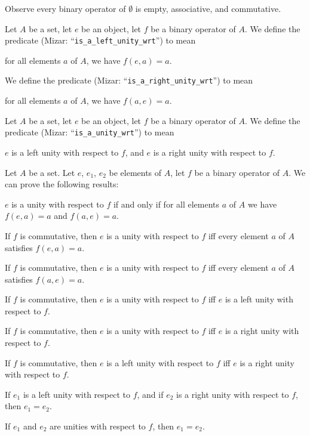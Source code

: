 \documentclass{article}
\begin{document}
Observe every binary operator of $\emptyset$ is empty, associative, and
commutative.

\begin{definition}
Let $A$ be a set, let $e$ be an object, let $f$ be a binary operator of
$A$.
We define the predicate 
(Mizar: ``\verb#is_a_left_unity_wrt#'') to mean
\begin{defn}
\item for all elements $a$ of $A$, we have $f(e,a)=a$.
\end{defn}
We define the predicate 
(Mizar: ``\verb#is_a_right_unity_wrt#'') to mean
\begin{defn}
\item for all elements $a$ of $A$, we have $f(a,e)=a$.
\end{defn}
\end{definition}

\begin{definition}
Let $A$ be a set, let $e$ be an object, let $f$ be a binary operator of $A$.
We define the predicate 
(Mizar: ``\verb#is_a_unity_wrt#'') to mean
\begin{defn}
\item\label{binop1:def7} $e$ is a left unity with respect to $f$, and $e$ is a right unity
  with respect to $f$.
\end{defn}
\end{definition}

Let $A$ be a set.
Let $e$, $e_{1}$, $e_{2}$ be elements of $A$,
let $f$ be a binary operator of $A$.
We can prove the following results:
\begin{thm}
\item\label{binop1:3} $e$ is a unity with respect to $f$ if and only if
  for all elements $a$ of $A$ we have $f(e,a)=a$ and $f(a,e)=a$.
\item\label{binop1:4} If $f$ is commutative,
  then $e$ is a unity with respect to $f$ iff every element $a$ of $A$
  satisfies $f(e,a)=a$.
\item\label{binop1:5} If $f$ is commutative,
  then $e$ is a unity with respect to $f$ iff every element $a$ of $A$
  satisfies $f(a,e)=a$.
\item\label{binop1:6} If $f$ is commutative,
  then $e$ is a unity with respect to $f$ iff $e$ is a left unity with
  respect to $f$.
\item\label{binop1:7} If $f$ is commutative,
  then $e$ is a unity with respect to $f$ iff $e$ is a right unity with
  respect to $f$.
\item\label{binop1:8} If $f$ is commutative,
  then $e$ is a left unity with respect to $f$ iff $e$ is a right unity with
  respect to $f$.
\item\label{binop1:9} If $e_{1}$ is a left unity with respect to $f$,
  and if $e_{2}$ is a right unity with respect to $f$, then $e_{1}=e_{2}$.
\item\label{binop1:10} If $e_{1}$ and $e_{2}$ are unities with respect
  to $f$, then $e_{1}=e_{2}$.
\end{thm}
\end{document}
